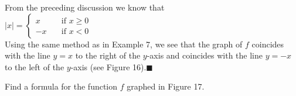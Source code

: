 \documentclass{sebase}
\begin{document}
\begin{Solution}
From the preceding discussion we know that \\[6pt]
\hspace*{\fill}$\left\vert x\right\vert =\left\{ 
\begin{array}{ll}
x & \text{if }x\geq 0 \\ 
-x\quad & \text{if }x<0%
\end{array}%
\right. $\hspace*{\fill}\\[6pt]
Using the same method as in Example 7, we see that the graph of $f$
coincides with the line $y=x$ to the right of the $y$-axis and coincides
with the line $y=-x$ to the left of the $y$-axis (see Figure 16).$%
\blacksquare $\vspace{-12pt}
\end{Solution}

\begin{Example}[9]
Find a
formula for the function $f$ graphed in Figure 17.
\end{Example}
\end{document}
